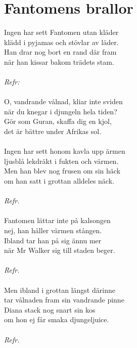 \section{Fantomens brallor}
Ingen har sett Fantomen utan kläder\\
klädd i pyjamas och stövlar av läder.\\
Han drar nog bort en rand där fram\\
när han kissar bakom trädets stam.\\
\\
\textit{Refr:}\\
\\
O, vandrande vålnad, kliar inte sviden\\
när du knegar i djungeln hela tiden?\\
Gör som Guran, skaffa dig en kjol,\\
det är bättre under Afrikas sol.\\
\\
Ingen har sett honom kavla upp ärmen\\
ljusblå lekdräkt i fukten och värmen.\\
Men han blev nog frusen om sin häck\\
om han satt i grottan alldeles näck.\\
\\
\textit{Refr.}\\
\\
Fantomen lättar inte på kalsongen\\
nej, han håller värmen stången.\\
Ibland tar han på sig ännu mer\\
när Mr Walker sig till staden beger.\\
\\
\textit{Refr.}\\
\\
Men ibland i grottan längst därinne\\
tar vålnaden fram sin vandrande pinne\\
Diana stack nog snart sin kos\\
om hon ej får smaka djungeljuice.\\
\\
\textit{Refr.}\\
